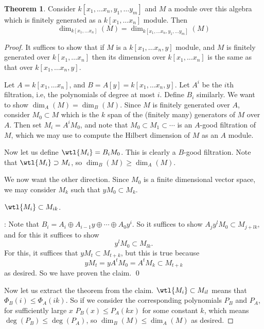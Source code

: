 \documentclass[12 pt]{article}
\theoremstyle{definition}
\newtheorem{thm}{Theorem}[section]
\renewcommand{\(}{\left(}
\renewcommand{\)}{\right)}
\begin{document}
\begin{thm} Consider $k[x_1, \ldots x_n, y_1, \ldots y_m]$ and $M$ a module over this algebra which is finitely generated as a $k[x_1, \ldots x_n]$ module. Then
\[\dim_{k[x_1, \ldots x_n]}(M)=\dim_{k[x_1, \ldots x_n, y_1, \ldots y_m]}(M)\]

\label{hilbdimwelldef}

\end{thm}
\begin{proof}
It suffices to show that if $M$ is a $k[x_1, \ldots x_n,y]$ module, and $M$ is finitely generated over $k[x_1, \ldots x_n]$ then its dimension over $k[x_1, \ldots x_n]$ is the same as that over $k[x_1, \ldots x_n,y]$.

Let $A=k[x_1, \ldots x_n]$, and $B=A[y]=k[x_1, \ldots x_n,y]$. Let $A^i$ be the $i$th filtration, i.e, the polynomials of degree at most $i$. Define $B_i$ similarly. We want to show $\dim_A(M)=\dim_B(M)$. Since $M$ is finitely generated over $A$, consider $M_0 \subset M$ which is the $k$ span of the (finitely many) generators of $M$ over $A$. Then set $M_i=A^iM_0$, and note that $M_0 \subset M_1 \subset \cdots$ is an $A$-good filtration of $M$, which we may use to compute the Hilbert dimension of $M$ as an $A$ module.

Now let us define $\wtl{M_i}=B_iM_0$. This is clearly a $B$-good filtration. Note that $\wtl{M_i} \supset M_i$, so $\dim_B(M) \geq \dim_A(M)$.

We now want the other direction. Since $M_0$ is a finite dimensional vector space, we may consider $M_k$ such that $yM_0 \subset M_k$.

 $\wtl{M_i} \subset M_{ik}$.

: Note that $B_i=A_i \oplus A_{i-1}y \oplus \cdots \oplus A_0y^i$. So it suffices to show $A_jy^lM_0 \subset M_{j+lk},$ and for this it suffices to show
\[y^lM_0 \subset M_{lk}.\]
For this, it suffices that $yM_t \subset M_{t+k}$, but this is true because
\[yM_t=yA^tM_0=A^tM_k \subset M_{t+k}\]
as desired. So we have proven the claim. \qed

Now let us extract the theorem from the claim. $\wtl{M_i} \subset M_{il}$ means that $\Phi_B(i) \leq \Phi_A(ik)$. So if we consider the corresponding polynomials $P_B$ and $P_A$, for sufficiently large $x$ $P_B(x) \leq P_A(kx)$ for some constant $k$, which means $\deg(P_B) \leq \deg(P_A)$, so $\dim_B(M) \leq \dim_A(M)$ as desired.

\end{proof}
\end{document}
